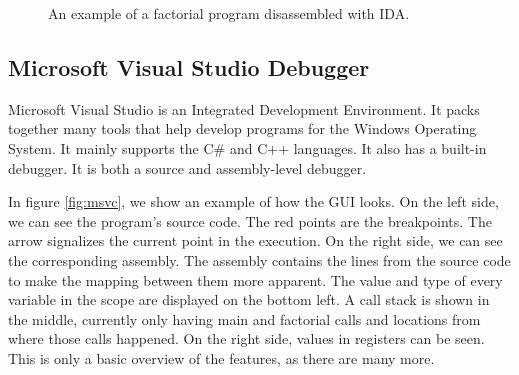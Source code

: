 \begin{figure}
    \caption{An example of a factorial program disassembled with IDA.}
    \label{fig:ida}
\end{figure}

\subsection{Microsoft Visual Studio Debugger}
Microsoft Visual Studio is an Integrated Development Environment. It packs
together many tools that help develop programs for the Windows Operating
System. It mainly supports the C\# and C++ languages. It also has a built-in
debugger. It is both a source and assembly-level debugger.

In figure \ref{fig:msvc}, we show an example of how the GUI looks. On the left
side, we can see the program's source code. The red points are the breakpoints.
The arrow signalizes the current point in the execution. On the right side, we
can see the corresponding assembly. The assembly contains the lines from the
source code to make the mapping between them more apparent. The value and type
of every variable in the scope are displayed on the bottom left. A call stack
is shown in the middle, currently only having main and factorial calls and
locations from where those calls happened. On the right side, values in
registers can be seen. This is only a basic overview of the features, as there
are many more.

